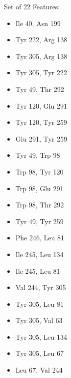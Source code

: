 Set of 22 Features:
\begin{itemize}
\item{Ile 40, Asn 199}
\item{Tyr 222, Arg 138}
\item{Tyr 305, Arg 138}
\item{Tyr 305, Tyr 222}
\item{Tyr 49, Thr 292}
\item{Tyr 120, Glu 291}
\item{Tyr 120, Tyr 259}
\item{Glu 291, Tyr 259}
\item{Tyr 49, Trp 98}
\item{Trp 98, Tyr 120}
\item{Trp 98, Glu 291}
\item{Trp 98, Thr 292}
\item{Tyr 49, Tyr 259}
\item{Phe 246, Leu 81}
\item{Ile 245, Leu 134}
\item{Ile 245, Leu 81}
\item{Val 244, Tyr 305}
\item{Tyr 305, Leu 81}
\item{Tyr 305, Val 63}
\item{Tyr 305, Leu 134}
\item{Tyr 305, Leu 67}
\item{Leu 67, Val 244}
\end{itemize}

